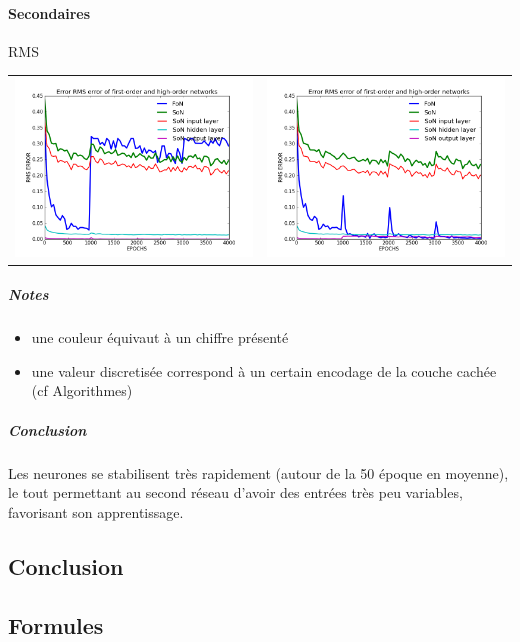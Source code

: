     \paragraph{Secondaires}
      RMS
      \begin{center}
	\begin{tabular}{lr}
	  \hspace*{-1cm}
	  \includegraphics[width=250px]{data/expB2/rms.png}
	  &
	  \includegraphics[width=250px]{data/expB2/rms_block.png} 
	\end{tabular}
      \end{center} 
      \subparagraph{Notes}
	\begin{itemize}
	  \item une couleur équivaut à un chiffre présenté
	  \item une valeur discretisée correspond à un certain encodage de la couche cachée (cf Algorithmes)
	\end{itemize}
      \subparagraph{Conclusion}
	Les neurones se stabilisent très rapidement (autour de la 50 époque en moyenne), 
	le tout permettant au second réseau d'avoir des entrées très peu variables, favorisant
	son apprentissage.

  \subsection{Conclusion}
  
  

  \newpage 
  \subsection{Formules}
    
    
    



